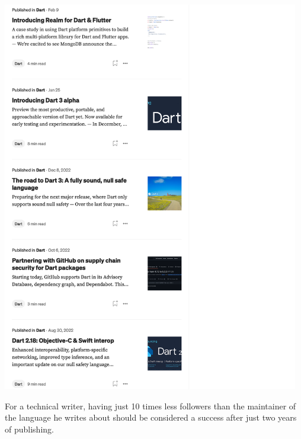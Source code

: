 \Continuing
\begin{center}
    \includegraphics[width=35em]{thomsen-followers-p2}
\end{center}

For a technical writer, having just 10 times less followers than the maintainer of the language
he writes about should be considered a success after just two years of publishing.

\pagebreak
